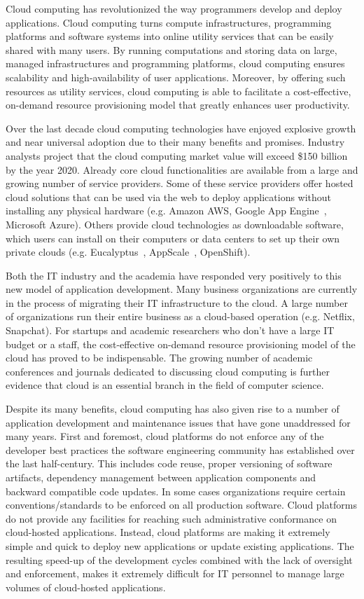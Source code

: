 Cloud computing has revolutionized the way programmers develop and deploy applications.
Cloud computing turns compute infrastructures, programming platforms and software systems
into online utility services that can be easily shared with many users.
By running computations and storing data on large, managed infrastructures and 
programming platforms, cloud computing ensures scalability and high-availability of 
user applications. Moreover, by offering such resources
as utility services, cloud computing is able to facilitate a cost-effective, on-demand
resource provisioning model that greatly enhances user productivity.

Over the last decade cloud computing technologies have enjoyed explosive growth 
and near universal adoption due to their many benefits and promises. 
Industry analysts project that the cloud computing market value will exceed \$150 billion
by the year 2020.
Already core cloud 
functionalities are available from a large and growing number of service providers. 
Some of these service providers offer hosted cloud solutions that can be used
via the web to deploy applications without installing any physical hardware 
(e.g. Amazon AWS, Google App Engine~\cite{gae}, Microsoft Azure). Others
provide cloud technologies as downloadable software, which users can install
on their computers or data centers to set up their own private clouds 
(e.g. Eucalyptus~\cite{eucalyptus09}, AppScale~\cite{6488671}, OpenShift). 

Both the IT industry and the academia have responded very positively to this new 
model of application 
development. Many business organizations are currently in the process of migrating
their IT infrastructure to the cloud. A large number of organizations
run their entire business as a cloud-based operation (e.g. Netflix, Snapchat). For startups
and academic researchers who don't have a large IT budget or a staff, the cost-effective 
on-demand resource provisioning model of the cloud has proved to be indispensable.
The growing number of academic conferences and journals dedicated to discussing
cloud computing is further evidence that cloud is an essential branch in the field
of computer science.

Despite its many benefits, cloud computing has also given rise to a number of application
development and maintenance issues that have gone unaddressed for many years. 
First and foremost, cloud platforms do not enforce any of the developer best practices
the software engineering community has established over the last half-century. This
includes code reuse, proper versioning of software artifacts, dependency management
between application components and backward compatible code updates. In
some cases organizations require certain conventions/standards to be enforced on
all production software. Cloud platforms do not provide any facilities for reaching
such administrative conformance on cloud-hosted applications. Instead, cloud platforms
are making it extremely simple and quick to deploy new applications or update existing
applications. The resulting speed-up of the development cycles combined with the lack of 
oversight and enforcement, makes it extremely difficult for 
IT personnel to manage large volumes of cloud-hosted applications.

